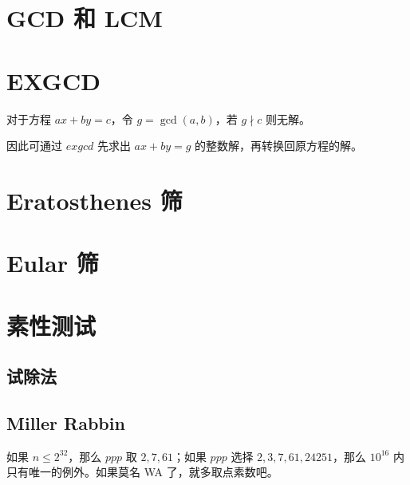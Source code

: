 \documentclass[cn,11pt,blue,normal,founder]{elegantbook}
\begin{document}
\section{GCD 和 LCM} %



\section{EXGCD} %

对于方程 $ax+by=c$，令 $g=\gcd(a,b)$，若 $g\nmid c$ 则无解。

因此可通过 $exgcd$ 先求出 $ax+by=g$ 的整数解，再转换回原方程的解。





\section{Eratosthenes 筛}



\section{Eular 筛}



\section{素性测试}

\subsection{试除法}



\subsection{Miller Rabbin}

如果 $n\leqslant 2^{32}$，那么 $ppp$ 取 $2,7,61$；如果 $ppp$ 选择 $2,3,7,61,24251$，那么 $10^{16}$ 内只有唯一的例外。如果莫名 WA 了，就多取点素数吧。

\end{document}
